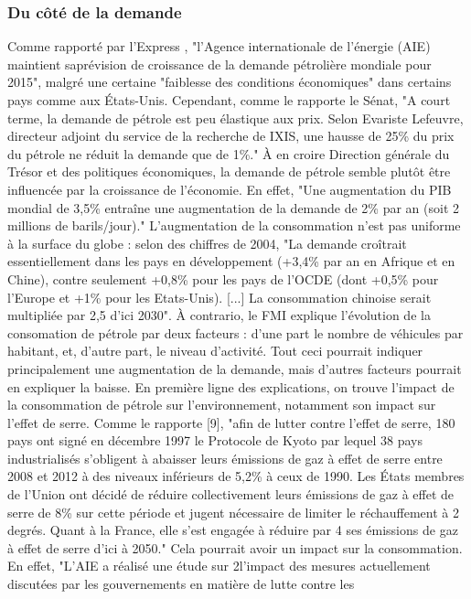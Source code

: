 \subsubsection{Du côté de la demande}
Comme rapporté par l’Express \cite{expressAIEPrevi}, "l’Agence internationale de l’énergie (AIE) maintient saprévision de croissance de la demande pétrolière mondiale pour 2015", malgré une certaine "faiblesse des conditions économiques" dans certains pays comme aux États-Unis. Cependant, comme le rapporte le Sénat, "A court terme, la demande de pétrole est peu élastique aux prix. Selon Evariste Lefeuvre, directeur adjoint du service de la recherche de IXIS, une hausse de 25\% du prix du pétrole ne réduit la demande que de 1\%." À en croire Direction générale du Trésor et des politiques économiques, la demande de pétrole semble plutôt être influencée par la croissance de l’économie. En effet, "Une augmentation du PIB mondial de 3,5\% entraîne une augmentation de la demande de 2\% par an (soit 2 millions de barils/jour)."
L’augmentation de la consommation n’est pas uniforme à la surface du globe : selon des chiffres de 2004, "La demande croîtrait essentiellement dans les pays en développement (+3,4\% par an en Afrique et en Chine), contre seulement +0,8\% pour les pays de l’OCDE (dont +0,5\% pour l’Europe et +1\% pour les Etats-Unis). [...] La consommation chinoise serait multipliée par 2,5 d’ici 2030".
À contrario, le FMI explique l’évolution de la consomation de pétrole par deux facteurs : d’une part le nombre de véhicules par habitant, et, d’autre part, le niveau d’activité. 
Tout ceci pourrait indiquer principalement une augmentation de la demande, mais d’autres
facteurs pourrait en expliquer la baisse. En première ligne des explications, on trouve l’impact de
la consommation de pétrole sur l’environnement, notamment son impact sur l’effet de serre.
Comme le rapporte [9], "afin de lutter contre l’effet de serre, 180 pays ont signé en décembre 1997
le Protocole de Kyoto par lequel 38 pays industrialisés s’obligent à abaisser leurs émissions de gaz
à effet de serre entre 2008 et 2012 à des niveaux inférieurs de 5,2\% à ceux de 1990. Les États
membres de l’Union ont décidé de réduire collectivement leurs émissions de gaz à effet de serre de
8\% sur cette période et jugent nécessaire de limiter le réchauffement à 2 degrés. Quant à la France,
elle s’est engagée à réduire par 4 ses émissions de gaz à effet de serre d’ici à 2050."
Cela pourrait avoir un impact sur la consommation. En effet, "L’AIE a réalisé une étude sur
2l’impact des mesures actuellement discutées par les gouvernements en matière de lutte contre les
